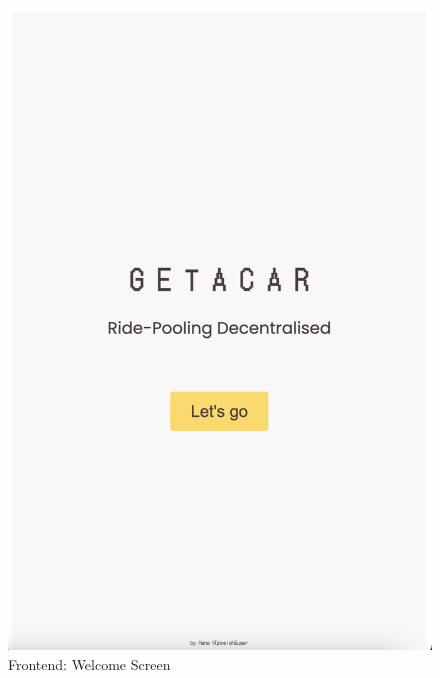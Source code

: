\begin{figure}[h]
    \centering
    
    \begin{minipage}{0.45\linewidth}
        \centering
        \includegraphics[width=\linewidth]{data/ffss/1.png}
        \caption{Frontend: Welcome Screen}
        \label{fig:WelcomeScreen}
    \end{minipage}
    \hfill
    \begin{minipage}{0.45\linewidth}
        \centering

\end{minipage}
\end{figure}
